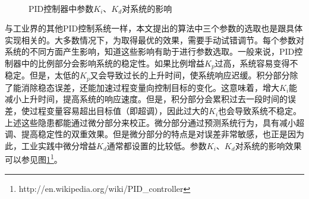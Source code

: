\begin{figure}[!t]
	\centering
	\vspace{10pt}
	\vspace{10pt}
	 \\
	\vspace{10pt}
	\caption{PID控制器中参数$K_i$、$K_d$对系统的影响}
	\label{fig:pid-tuning}
\end{figure}

与工业界的其他PID控制系统一样，本文提出的算法中三个参数的选取也是跟具体实现相关的。大多数情况下，为取得最优的效果，需要手动试错调节。每个参数对系统的不同方面产生影响，知道这些影响有助于进行参数选取。一般来说，PID控制器中的比例部分会影响系统的稳定性。如果比例增益$K_p$过高，系统容易变得不稳定。但是，太低的$K_p$又会导致过长的上升时间，使系统响应迟缓。积分部分除了能消除稳态误差，还能加速过程变量向控制目标的变化。这意味着，增大$K_i$能减小上升时间，提高系统的响应速度。但是，积分部分会累积过去一段时间的误差，使过程变量容易超出目标值（即超调），因此过大的$K_i$也会导致系统不稳定。上述这些隐患都能通过微分部分来校正。微分部分通过预测系统行为，具有减小超调、提高稳定性的双重效果。但是微分部分的特点是对误差非常敏感，也正是因为此，工业实践中微分增益$K_d$通常都设置的比较低。参数$K_i$、$K_d$对系统的影响效果可以参见图\ref{fig:pid-tuning}\footnote{http://en.wikipedia.org/wiki/PID\_controller}。

